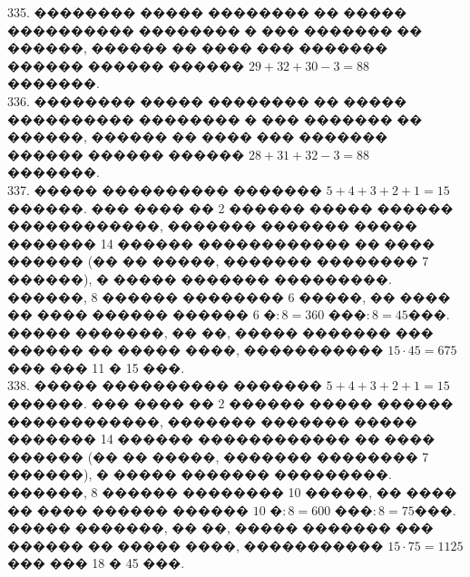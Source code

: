 \documentclass[12pt]{article}
\begin{document}
335. �������� ����� �������� �� ����� ���������� �������� � ��� ������� �� ������, ������ �� ���� ��� ������� ������ ������ ������ $29+32+30-3=88$ �������.\\
336. �������� ����� �������� �� ����� ���������� �������� � ��� ������� �� ������, ������ �� ���� ��� ������� ������ ������ ������ $28+31+32-3=88$ �������.\\
337. ����� ���������� ������� $5+4+3+2+1=15$ ������. ��� ���� �� 2 ������ ����� ������ ������������, ������� ������� ����� ������� 14 ������ ������������ �� ���� ������ (�� �� �����, ������� �������� 7 ������), � ����� ������� ���������. ������, 8 ������ �������� 6 �����, �� ���� �� ���� ������ ������ $6\text{ �}:8= 360\text{ ���}:8=45$���. ����� �������, �� ��, ����� ������� ��� ������ �� ����� ����, ����������� $15\cdot45=675$��� ��� 11 � 15 ���.\\
338. ����� ���������� ������� $5+4+3+2+1=15$ ������. ��� ���� �� 2 ������ ����� ������ ������������, ������� ������� ����� ������� 14 ������ ������������ �� ���� ������ (�� �� �����, ������� �������� 7 ������), � ����� ������� ���������. ������, 8 ������ �������� 10 �����, �� ���� �� ���� ������ ������ $10\text{ �}:8= 600\text{ ���}:8=75$���. ����� �������, �� ��, ����� ������� ��� ������ �� ����� ����, ����������� $15\cdot75=1125$��� ��� 18 � 45 ���.
\newpage
\end{document}
